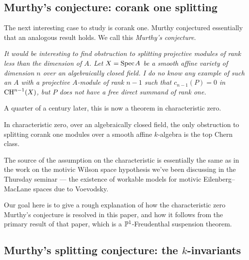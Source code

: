 \documentclass[11pt,openany]{book}
\newcommand{\quoteblock}[2]{\epigraph{\itshape#1}{#2}}
\begin{document}
\subsection{Murthy's conjecture: corank one splitting}



The next interesting case to study is corank one. Murthy conjectured essentially that an analogous result holds. We call this \textit{Murthy's conjecture}.


\quoteblock{It would be interesting to find obstruction to splitting projective modules of rank less than the dimension of $A$. Let $X = \Spec A$ be a smooth affine variety of dimension $n$ over an algebraically closed field. I do no know any example of such an $A$ with a projective $A$-module of rank $n-1$ such that $c_{n-1}(P) = 0$ in $\CH^{n-1}(X)$, but $P$ does not have a free direct summand of rank one.}{\cite[p.~173]{Murthy-survey}}

A quarter of a century later, this is now a theorem in characteristic zero.

\begin{theorem} In characteristic zero, over an algebraically closed field, the only obstruction to splitting corank one modules over a smooth affine $k$-algebra is the top Chern class.
\end{theorem}

The source of the assumption on the characteristic is essentially the same as in the work on the motivic Wilson space hypothesis we've been discussing in the Thursday seminar --- the existence of workable models for motivic Eilenberg--MacLane spaces due to Voevodsky.

Our goal here is to give a rough explanation of how the characteristic zero Murthy's conjecture is resolved in this paper, and how it follows from the primary result of that paper, which is a $\P^1$-Freudenthal suspension theorem.

\subsection{Murthy's splitting conjecture: the $k$-invariants}
\end{document}
